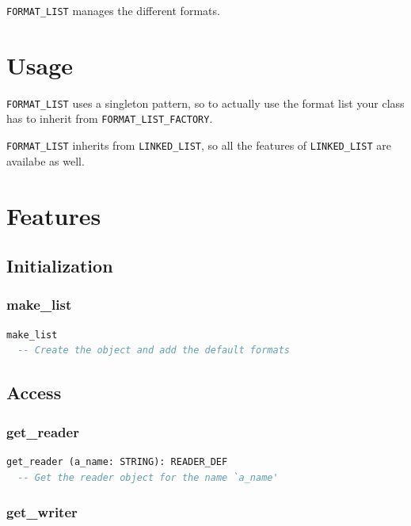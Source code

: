 \texttt{FORMAT\_LIST} manages the different formats.


\section{Usage}
\label{management-usage}

\texttt{FORMAT\_LIST} uses a singleton pattern, so to actually use the
format list your class has to inherit from
\texttt{FORMAT\_LIST\_FACTORY}.

\texttt{FORMAT\_LIST} inherits from \texttt{LINKED\_LIST}, so all the
features of \texttt{LINKED\_LIST} are availabe as well.


\section{Features}
\label{sec:management-features}


\subsection{Initialization}
\label{sec:management-initialization}

\subsubsection{make\_list}

\begin{lstlisting}[language=Eiffel]
make_list
  -- Create the object and add the default formats
\end{lstlisting}


\subsection{Access}
\label{sec:management-access}

\subsubsection{get\_reader}

\begin{lstlisting}[language=Eiffel]
get_reader (a_name: STRING): READER_DEF
  -- Get the reader object for the name `a_name'
\end{lstlisting}

\subsubsection{get\_writer}

